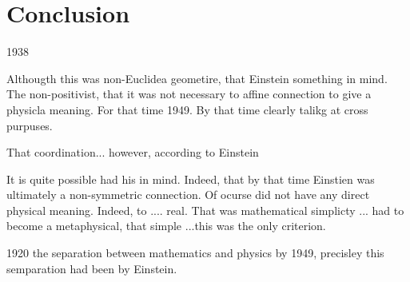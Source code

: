 \documentclass[draft]{article}
\begin{document}
\section{Conclusion}

1938

Althougth this was non-Euclidea geometire, that Einstein something in mind. The non-positivist, that it was not necessary to affine connection to give a physicla meaning. For that time 1949. By that time clearly talikg at cross purpuses.

That coordination... however, according to Einstein


It is quite possible had his in mind. Indeed, that by that time Einstien was ultimately a non-symmetric connection. Of ocurse did not have any direct physical meaning. Indeed, to .... real. That was mathematical simplicty ... had to become a metaphysical, that simple ...this was the only criterion. 

1920 the separation between mathematics and physics by 1949, precisley this semparation had been by Einstein.





\lipsum*[1-4]

\printshorthands
\printbibliography
\end{document}
